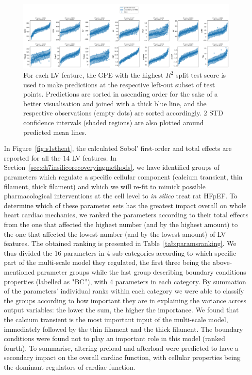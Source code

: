 \begin{figure}[!ht]
    \myfloatalign
    \includegraphics[width=\textwidth]{figures/chapter07/bgpes_vs_bsplit_16p.pdf}
    \caption{For each LV feature, the GPE with the highest $R^2$ split test score is used to make predictions at the respective left-out subset of test points. Predictions are sorted in ascending order for the sake of a better visualisation and joined with a thick blue line, and the respective observations (empty dots) are sorted accordingly. $2$ STD confidence intervals (shaded regions) are also plotted around predicted mean lines.}
    \label{fig:bgpevsbsplitfinal}
\end{figure}

\vspace{0.2cm}
In Figure~\ref{fig:s1stheat}, the calculated Sobol' first-order and total effects are reported for all the $14$ LV features. In Section~\ref{sec:ch7insilicorecoveryingmethods}, we have identified groups of parameters which regulate a specific cellular component (calcium transient, thin filament, thick filament) and which we will re-fit to mimick possible pharmacological interventions at the cell level to \textit{in silico} treat rat HFpEF. To determine which of these parameter sets has the greatest impact overall on whole heart cardiac mechanics, we ranked the parameters according to their total effects from the one that affected the highest number (and by the highest amount) to the one that affected the lowest number (and by the lowest amount) of LV features. The obtained ranking is presented in Table~\ref{tab:paramsranking}. We thus divided the $16$ parameters in $4$ sub-categories according to which specific part of the multi-scale model they regulated, the first three being the above-mentioned parameter groups while the last group describing boundary conditions properties (labelled as "BC''), with $4$ parameters in each category. By summation of the parameters' individual ranks within each category we were able to classify the groups according to how important they are in explaining the variance across output variables: the lower the sum, the higher the importance. We found that the calcium transient is the most important input of the multi-scale model, immediately followed by the thin filament and the thick filament. The boundary conditions were found not to play an important role in this model (ranked fourth). To summarise, altering preload and afterload were predicted to have a secondary impact on the overall cardiac function, with cellular properties being the dominant regulators of cardiac function.

